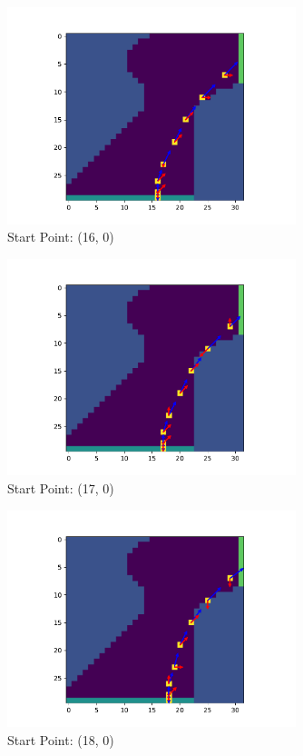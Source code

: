 \documentclass{article}
\begin{document}
\begin{figure}[H]
	\centering
	\includegraphics[width=0.75\textwidth]{../figure/fig_16}
	\caption{Start Point: (16, 0)}
	\label{fig:fig_16}
\end{figure}


\begin{figure}[H]
	\centering
	\includegraphics[width=0.75\textwidth]{../figure/fig_17}
	\caption{Start Point: (17, 0)}
	\label{fig:fig_17}
\end{figure}


\begin{figure}[H]
	\centering
	\includegraphics[width=0.75\textwidth]{../figure/fig_18}
	\caption{Start Point: (18, 0)}
	\label{fig:fig_18}
\end{figure}
\end{document}
